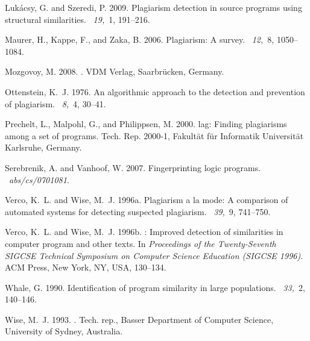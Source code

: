 \documentclass{tlp}
\begin{document}
\begin{thebibliography}{}
{\sc Luk{\'a}csy, G.} {\sc and} {\sc Szeredi, P.} 2009.
\newblock Plagiarism detection in source programs using structural
  similarities.
~{\em 19,\/}~1, 191--216.

{\sc Maurer, H.}, {\sc Kappe, F.}, {\sc and} {\sc Zaka, B.} 2006.
\newblock Plagiarism: {A} survey.
~{\em 12,\/}~8,
  1050--1084.

{\sc Mozgovoy, M.} 2008.
.
\newblock VDM Verlag, Saar\-br\"{u}cken, Germany.

{\sc Ottenstein, K.~J.} 1976.
\newblock An algorithmic approach to the detection and prevention of
  plagiarism.
~{\em 8,\/}~4, 30--41.

{\sc Prechelt, L.}, {\sc Malpohl, G.}, {\sc and} {\sc Philippsen, M.} 2000.
lag: Finding plagiarisms among a set of programs.
\newblock Tech. Rep. 2000-1, Fakult{\"{a}}t f{\"{u}}r Informatik
  Universit{\"{a}}t Karlsruhe, Germany.

{\sc Serebrenik, A.} {\sc and} {\sc Vanhoof, W.} 2007.
\newblock Fingerprinting logic programs.
~{\em abs/cs/0701081}.

{\sc Verco, K.~L.} {\sc and} {\sc Wise, M.~J.} 1996a.
\newblock Plagiarism a la mode: A comparison of automated systems for detecting
  suspected plagiarism.
~{\em 39,\/}~9, 741--750.

{\sc Verco, K.~L.} {\sc and} {\sc Wise, M.~J.} 1996b.
: Improved detection of similarities in computer program and
  other texts.
\newblock In {\em Proceedings of the Twenty-Seventh {SIGCSE} Technical
  Symposium on Computer Science Education {\rm (}SIGCSE 1996{\rm )}}. ACM
  Press, New York, NY, USA, 130--134.

{\sc Whale, G.} 1990.
\newblock Identification of program similarity in large populations.
~{\em 33,\/}~2, 140--146.

{\sc Wise, M.~J.} 1993.
.
\newblock Tech. rep., Basser Department of Computer Science, University of
  Sydney, Australia.

\end{thebibliography}
\end{document}
